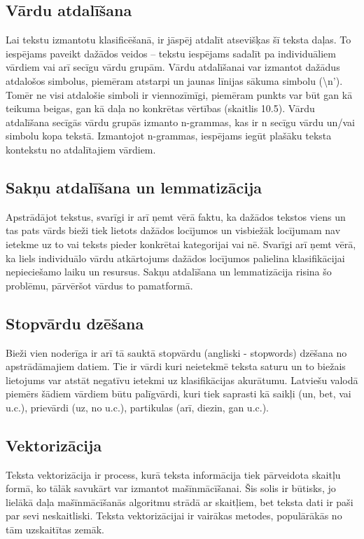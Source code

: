 \subsection{Vārdu atdalīšana}
Lai tekstu izmantotu klasificēšanā, ir jāspēj atdalīt atsevišķas šī teksta daļas. To iespējams paveikt dažādos veidos – tekstu iespējams sadalīt pa individuāliem vārdiem vai arī  secīgu vārdu grupām. Vārdu atdalīšanai var izmantot dažādus atdalošos simbolus, piemēram atstarpi un jaunas līnijas sākuma simbolu (\textbackslash n’). Tomēr ne visi atdalošie simboli ir viennozīmīgi, piemēram punkts var būt gan kā teikuma beigas, gan kā daļa no konkrētas vērtības (skaitlis 10.5).
Vārdu atdalīšana secīgās vārdu grupās izmanto n-grammas, kas ir n secīgu vārdu un/vai simbolu kopa tekstā. Izmantojot n-grammas, iespējams iegūt plašāku teksta kontekstu no atdalītajiem vārdiem.

\subsection{Sakņu atdalīšana un lemmatizācija}
Apstrādājot tekstus, svarīgi ir arī ņemt vērā faktu, ka dažādos tekstos viens un tas pats vārds bieži tiek lietots dažādos locījumos un visbiežāk locījumam nav ietekme uz to vai teksts pieder konkrētai kategorijai vai nē. Svarīgi arī ņemt vērā, ka liels individuālo vārdu atkārtojums dažādos locījumos palielina klasifikācijai nepieciešamo laiku un resursus. Sakņu atdalīšana un lemmatizācija risina šo problēmu, pārvēršot vārdus to pamatformā. 

\subsection{Stopvārdu dzēšana}
Bieži vien noderīga ir arī tā sauktā stopvārdu (angliski - stopwords) dzēšana no apstrādāmajiem datiem. Tie ir vārdi kuri neietekmē teksta saturu un to biežais lietojums var atstāt negatīvu ietekmi uz klasifikācijas akurātumu. Latviešu valodā piemērs šādiem vārdiem būtu palīgvārdi, kuri tiek saprasti kā saikļi (un, bet, vai u.c.), prievārdi (uz, no u.c.), partikulas (arī, diezin, gan u.c.).

\subsection{Vektorizācija}
Teksta vektorizācija ir process, kurā teksta informācija tiek pārveidota skaitļu formā, ko tālāk savukārt var izmantot mašīnmācīšanai. Šis solis ir būtisks, jo lielākā daļa mašīnmācīšanās algoritmu strādā ar skaitļiem, bet teksta dati ir paši par sevi neskaitliski. Teksta vektorizācijai ir vairākas metodes, populārākās no tām uzskaitītas zemāk.

